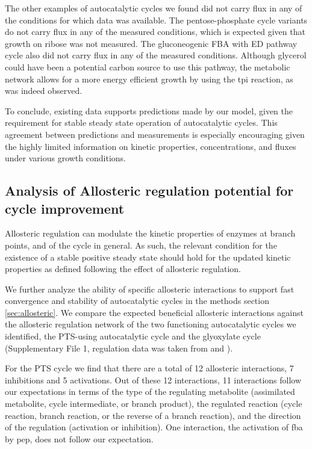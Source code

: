     The other examples of autocatalytic cycles we found did not carry flux in any of the conditions for which data was available.
    The pentose-phosphate cycle variants do not carry flux in any of the measured conditions, which is expected given that growth on ribose was not measured.
    The gluconeogenic FBA with ED pathway cycle also did not carry flux in any of the measured conditions.
    Although glycerol could have been a potential carbon source to use this pathway, the metabolic network allows for a more energy efficient growth by using the tpi reaction, as was indeed observed.

    To conclude, existing data supports predictions made by our model, given the requirement for stable steady state operation of autocatalytic cycles.
    This agreement between predictions and measurements is especially encouraging given the highly limited information on kinetic properties, concentrations, and fluxes under various growth conditions.

    \subsection{Analysis of Allosteric regulation potential for cycle improvement}
    Allosteric regulation can modulate the kinetic properties of enzymes at branch points, and of the cycle in general.
    As such, the relevant condition for the existence of a stable positive steady state should hold for the updated kinetic properties as defined following the effect of allosteric regulation.

    We further analyze the ability of specific allosteric interactions to support fast convergence and stability of autocatalytic cycles in the methods section \ref{sec:allosteric}.
    We compare the expected beneficial allosteric interactions against the allosteric regulation network of the two functioning autocatalytic cycles we identified, the PTS-using autocatalytic cycle and the glyoxylate cycle (Supplementary File 1, regulation data was taken from \cite{Keseler2013-xn} and \cite{Schomburg2004-st}).

    For the PTS cycle we find that there are a total of 12 allosteric interactions, 7 inhibitions and 5 activations.
    Out of these 12 interactions, 11 interactions follow our expectations in terms of the type of the regulating metabolite (assimilated metabolite, cycle intermediate, or branch product), the regulated reaction (cycle reaction, branch reaction, or the reverse of a branch reaction), and the direction of the regulation (activation or inhibition).
    One interaction, the activation of fba by pep, does not follow our expectation.

